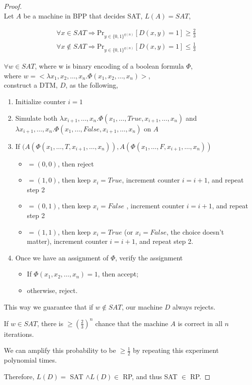 \documentclass[twoside,11pt]{homework}
\begin{document}
\begin{proof}
  \ \\
  Let $A$ be a machine in BPP that decides SAT, $L(A) = SAT$,
  \begin{given}
    \[
      \begin{aligned}
        \forall x \in SAT \Rightarrow \text{Pr}_{y \in \{0,1\}^{q(n)}}[D(x,y) = 1] \ge \frac{2}{3}\\
        \forall x \notin SAT \Rightarrow \text{Pr}_{y \in \{0,1\}^{q(n)}}[D(x,y) = 1] \le \frac{1}{3}
      \end{aligned}
    \]
  \end{given}
  $\forall w \in SAT$, where w is binary encoding of a boolean formula $\Phi$,\\
  where $w = < \lambda x_1, x_2, \dots, x_n. \Phi(x_1, x_2, \dots, x_n)>$,\\
  construct a DTM, $D$, as the following,
  \begin{enumerate}
  \item Initialize counter $i = 1$
  \item Simulate both $\lambda x_{i+1}, \dots, x_n. \Phi(x_1, \dots, True,x_{i+1}, \dots, x_n)$
    and\\ $\lambda x_{i+1}, \dots, x_n. \Phi(x_1, \dots, False, x_{i+1}, \dots, x_n)$ on $A$
  \item If $(A(\Phi(x_1, \dots, T,x_{i+1}, \dots, x_n)), A(\Phi(x_1, \dots, F, x_{i+1}, \dots, x_n))$
    \begin{itemize}
    \item $= (0,0)$, then reject
    \item $= (1,0)$, then keep $x_{i} = True$, increment counter $i = i + 1$, and repeat step 2
    \item $= (0,1)$, then keep $x_{i} = False$ , increment counter $i = i + 1$, and repeat step 2
    \item $= (1,1)$, then keep $x_{i} = True$ (or $x_{i} = False$, the choice doesn't
      matter), increment counter $i = i + 1$, and repeat step 2.
    \end{itemize}
  \item Once we have an assignment of $\Phi$, verify the assignment
    \begin{itemize}
    \item If $\Phi(x_1, x_2, \dots, x_n) = 1$, then accept;
    \item otherwise, reject.
    \end{itemize}
  \end{enumerate}

  This way we guarantee that if $w \notin SAT$, our machine $D$ always rejects.
  
  If $w \in SAT$, there is $\ge (\frac{2}{3})^n$ chance that the machine $A$ is
  correct in all $n$ iterations.

  We can amplify this probability to be $\ge \frac{1}{2}$ by repeating this
  experiment polynomial times.
  
  Therefore, $L(D) =$ SAT $\land L(D) \in$ RP, and thus SAT $\in$ RP.
\end{proof}
\end{document}
